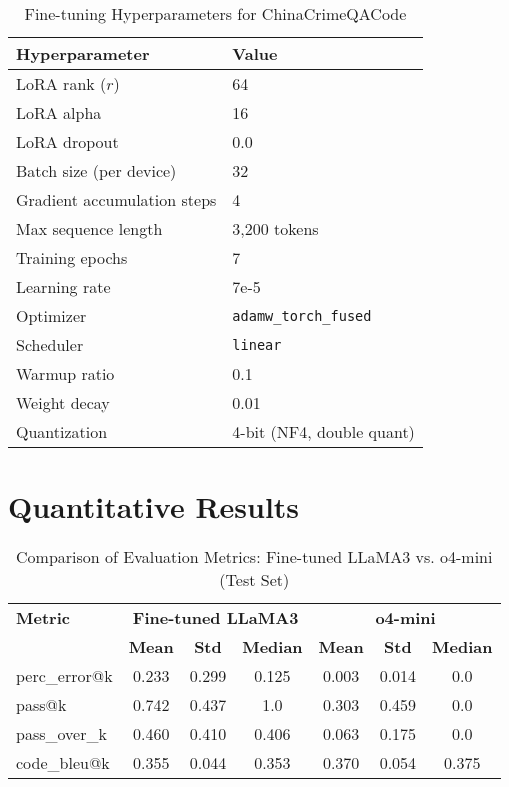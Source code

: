 \begin{table}[H]
\centering
\caption{Fine-tuning Hyperparameters for ChinaCrimeQACode}
\label{tab:hyperparameters}
\begin{tabular}{ll}
\toprule
\textbf{Hyperparameter} & \textbf{Value} \\
\midrule
LoRA rank ($r$) & 64 \\
LoRA alpha & 16 \\
LoRA dropout & 0.0 \\
Batch size (per device) & 32 \\
Gradient accumulation steps & 4 \\
Max sequence length & 3,200 tokens \\
Training epochs & 7 \\
Learning rate & 7e-5 \\
Optimizer & \texttt{adamw\_torch\_fused} \\
Scheduler & \texttt{linear} \\
Warmup ratio & 0.1 \\
Weight decay & 0.01 \\
Quantization & 4-bit (NF4, double quant) \\
\bottomrule
\end{tabular}
\end{table}

\section{Quantitative Results}


\begin{table}[h!]
\centering
\caption{Comparison of Evaluation Metrics: Fine-tuned LLaMA3 vs. o4-mini (Test Set)}
{%
\begin{tabular}{l|ccc|ccc}
\toprule
\textbf{Metric} & \multicolumn{3}{c|}{\textbf{Fine-tuned LLaMA3}} & \multicolumn{3}{c}{\textbf{o4-mini}} \\
\cmidrule(lr){2-4} \cmidrule(lr){5-7}
 & \textbf{Mean} & \textbf{Std} & \textbf{Median} & \textbf{Mean} & \textbf{Std} & \textbf{Median} \\
\midrule
perc\_error@k     & 0.233 & 0.299 & 0.125 & 0.003 & 0.014 & 0.0   \\
pass@k            & 0.742 & 0.437 & 1.0   & 0.303 & 0.459 & 0.0   \\
pass\_over\_k      & 0.460 & 0.410 & 0.406 & 0.063 & 0.175 & 0.0   \\
code\_bleu@k      & 0.355 & 0.044 & 0.353 & 0.370 & 0.054 & 0.375 \\
\bottomrule
\end{tabular}
}
\label{tab:combined_metrics}
\end{table}


